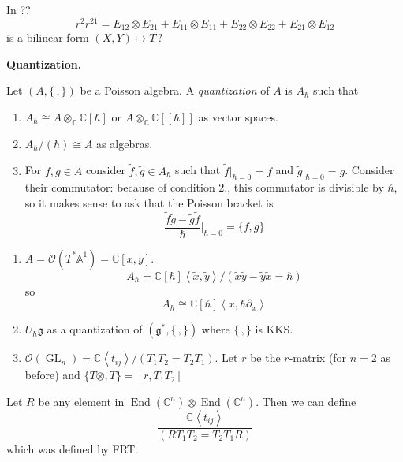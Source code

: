 \begin{remark}
\label{remark-l2-symmetric-part}
In ??
$$
r^{2}r^{21}=E_{12}\otimes E_{21}+
E_{11}\otimes E_{11}+
E_{22}\otimes E_{22}+
E_{21}\otimes E_{12}
$$
is a bilinear form $(X,Y)\mapsto T\,?$
\end{remark}

\medskip\noindent
{\bf Quantization.}

\begin{definition}[``Definition'']
\label{definition-l2-quantization}
Let $(A,\{\,,\} )$ be a Poisson algebra.
A {\it quantization} of $A$ is $A_{\hbar}$
such that
\begin{enumerate}
\item $A_{\hbar}\cong
A\otimes_{\mathbb{C}}\mathbb{C}[\hbar]$ or
$A\otimes_{\mathbb{C}}
\mathbb{C}[[\hbar]]$ as vector spaces.
\item $A_{\hbar}/(\hbar)\cong A$ as
algebras.
\item For $f,g\in A$ consider
$\widetilde{f},\widetilde{g}\in
A_{\hbar}$ such that
$\widetilde{f}|_{\hbar=0}=f$ and
$\widetilde{g}|_{\hbar=0}=g$.
Consider their commutator: because of
condition 2., this commutator is
divisible by $\hbar$, so it makes sense
to ask that the Poisson bracket is
$$
\frac{\widetilde{f}\widetilde{g}-
\widetilde{g}\widetilde{f}}{\hbar}
\Big|_{\hbar =0}=\{f,g\}
$$
\end{enumerate}
\end{definition}

\begin{example}
\label{example-l2-quantizations}
\begin{enumerate}
\item $A=\mathcal{O}(T^{*}
\mathbb{A}^{1})=\mathbb{C}[x,y]$.
$$
A_{\hbar}=\mathbb{C}[\hbar]
\left\langle{}\widetilde{x},
\widetilde{y}\right\rangle{} /
(\widetilde{x}\widetilde{y}-
\widetilde{y}\widetilde{x}=\hbar)
$$
so
$$
A_{\hbar}\cong \mathbb{C}[\hbar]
\left\langle{}x,\hbar \partial_{x}
\right\rangle{}
$$
\item $U_{\hbar}\mathfrak{g}$ as a
quantization of
$(\mathfrak{g}^{*},\{\,,\} )$ where
$\{\,,\}$ is KKS.
\item $\mathcal{O}(\operatorname{GL}_{n})
=\mathbb{C}\left\langle{}t_{ij}
\right\rangle{} /(T_{1}T_{2}=T_{2}T_{1})$.
Let $r$ be the $r$-matrix (for $n=2$ as
before) and
$\{T\otimes ,T\} =[r,T_{1}T_{2}]$
\end{enumerate}
\end{example}

\begin{definition}
\label{definition-l2-frt}
Let $R$ be any element in
$\operatorname{End}(\mathbb{C}^{n})\otimes
\operatorname{End}(\mathbb{C}^{n})$. Then
we can define
\begin{equation}
\label{equation-l2-frt}
\frac{\mathbb{C}\left\langle{}t_{ij}
\right\rangle{} }{(RT_{1}T_{2}=
T_{2}T_{1}R)}
\end{equation}
which was defined by FRT.
\end{definition}

